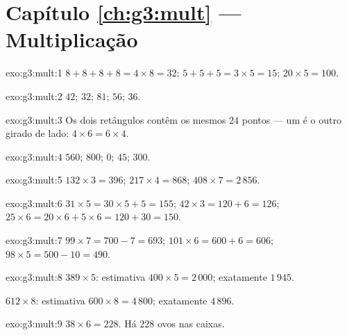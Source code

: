 \section*{Capítulo \ref{ch:g3:mult} --- Multiplicação}

\begin{solution}{exo:g3:mult:1}
$8 + 8 + 8 + 8 = 4 \times 8 = 32$; \quad
$5 + 5 + 5 = 3 \times 5 = 15$; \quad
$20 \times 5 = 100$.
\end{solution}

\begin{solution}{exo:g3:mult:2}
$42$; \quad $32$; \quad $81$; \quad $56$; \quad $36$.
\end{solution}

\begin{solution}{exo:g3:mult:3}
Os dois retângulos contêm os mesmos $24$ pontos --- um é o outro
girado de lado: $4 \times 6 = 6 \times 4$.
\end{solution}

\begin{solution}{exo:g3:mult:4}
$560$; \quad $800$; \quad $0$; \quad $45$; \quad $300$.
\end{solution}

\begin{solution}{exo:g3:mult:5}
$132 \times 3 = 396$; \quad
$217 \times 4 = 868$; \quad
$408 \times 7 = 2\,856$.
\end{solution}

\begin{solution}{exo:g3:mult:6}
$31 \times 5 = 30 \times 5 + 5 = 155$; \quad
$42 \times 3 = 120 + 6 = 126$; \quad
$25 \times 6 = 20 \times 6 + 5 \times 6 = 120 + 30 = 150$.
\end{solution}

\begin{solution}{exo:g3:mult:7}
$99 \times 7 = 700 - 7 = 693$; \quad
$101 \times 6 = 600 + 6 = 606$; \quad
$98 \times 5 = 500 - 10 = 490$.
\end{solution}

\begin{solution}{exo:g3:mult:8}
$389 \times 5$: estimativa $400 \times 5 = 2\,000$; exatamente
$1\,945$.

$612 \times 8$: estimativa $600 \times 8 = 4\,800$; exatamente
$4\,896$.
\end{solution}

\begin{solution}{exo:g3:mult:9}
$38 \times 6 = 228$. Há $228$ ovos nas caixas.
\end{solution}

